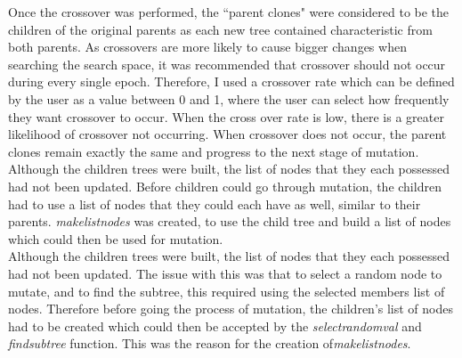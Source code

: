 \documentclass[11pt]{article}
\begin{document}
Once the crossover was performed, the ``parent clones" were considered to be the children of the original parents as each new tree contained characteristic from both parents. As crossovers are more likely to cause bigger changes when searching the search space, it was recommended that crossover should not occur during every single epoch. Therefore, I used a crossover rate which can be defined by the user as a value between 0 and 1, where the user can select how frequently they want crossover to occur. When the cross over rate is low, there is a greater likelihood of crossover not occurring. When crossover does not occur, the parent clones remain exactly the same and progress to the next stage of mutation. \\

Although the children trees were built, the list of nodes that they each possessed had not been updated. Before children could go through mutation, the children had to use a list of nodes that they could each have as well, similar to their parents. \textit{make\textunderscore list\textunderscore nodes} was created, to use the child tree and build a list of nodes which could then be used for mutation. \\

Although the children trees were built, the list of nodes that they each possessed had not been updated. The issue with this was that to select a random node to mutate, and to find the subtree, this required using the selected members list of nodes. Therefore before going the process of mutation, the children's list of nodes had to be created which could then be accepted by the \textit{select\textunderscore random\textunderscore val} and \textit{find\textunderscore subtree} function. This was the reason for the creation of\textit{make\textunderscore list\textunderscore nodes}. 
\end{document}
